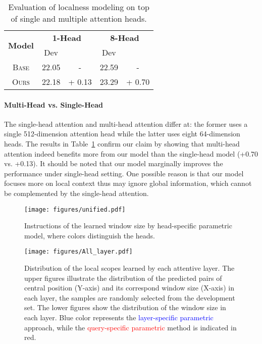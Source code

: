 \documentclass[11pt,a4paper]{article}
\begin{document}
\begin{table}[h]
  \centering
  \setcounter{table}{4}
\begin{tabular}{c||cc|cc}\multirow{2}{*}{\bf Model} & \multicolumn{2}{c}{\bf 1-Head}  & \multicolumn{2}{|c}{\bf 8-Head}  \\ 
\cline{2-5}
    &   Dev &       &   Dev &   \\
\hline \hline
\textsc{Base}   & 22.05  & -       &   22.59   & - \\
 \textsc{Ours}   & 22.18  & + 0.13    &   23.29   & + 0.70\\
  \end{tabular}
  \caption{Evaluation of localness modeling on top of single and multiple attention heads.}
  \label{tab:head}
\end{table}

\paragraph{Multi-Head vs. Single-Head}
The single-head attention and multi-head attention differ at: the former uses a single 512-dimension attention head while the latter uses eight 64-dimension heads.
The results in Table~\ref{tab:head} confirm our claim by showing that multi-head attention indeed benefits more from our model than the single-head model (+0.70 vs. +0.13).
It should be noted that our model marginally improves the performance under single-head setting. One possible reason is that our model focuses more on local context thus may ignore global information, which cannot be complemented by the single-head attention.



\begin{figure}[h]
\begin{center}
\texttt{[image: figures/unified.pdf]}
\caption{Instructions of the learned window size by head-specific parametric model, where colors distinguish the heads. 
\label{fig:glob}
}
\end{center}
\end{figure}


\begin{figure*}[t]
\begin{center}
\texttt{[image: figures/All\_layer.pdf]}
\caption{
\label{fig:window_size}
Distribution of the local scopes learned by each attentive layer. The upper figures illustrate the distribution of the predicted pairs of central position (Y-axis) and its correspond window size (X-axis) in each layer, the samples are randomly selected from the development set. The lower figures show the distribution of the window size in each layer. Blue color represents the \textcolor{blue}{layer-specific parametric} approach, while the \textcolor{red}{query-specific parametric} method is indicated in red. 
}
\end{center}
\end{figure*}
\end{document}
